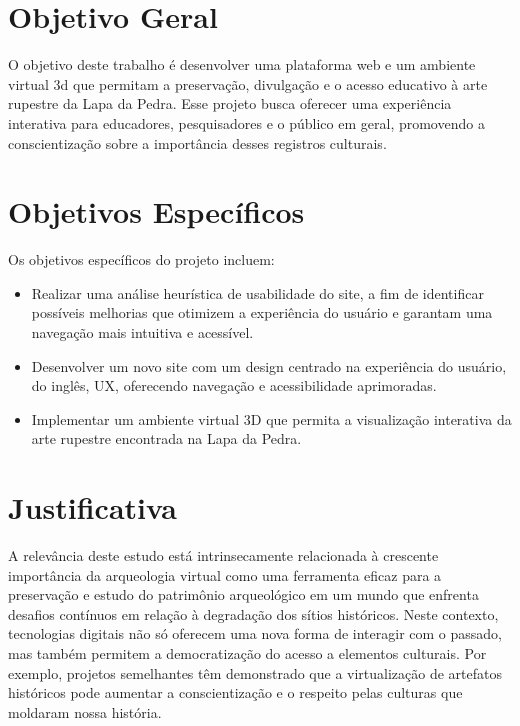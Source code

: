 \section{Objetivo Geral}
O objetivo deste trabalho é desenvolver uma plataforma web e um ambiente virtual \gls{3d} que permitam a preservação, divulgação e o acesso educativo à arte rupestre da Lapa da Pedra. Esse projeto busca oferecer uma experiência interativa para educadores, pesquisadores e o público em geral, promovendo a conscientização sobre a importância desses registros culturais.

\section{Objetivos Específicos}
Os objetivos específicos do projeto incluem:
\begin{itemize}
    \item Realizar uma análise heurística de usabilidade do site, a fim de identificar possíveis melhorias que otimizem a experiência do usuário e garantam uma navegação mais intuitiva e acessível.
    \item Desenvolver um novo site com um design centrado na experiência do usuário, do inglês, \gls{UX}, oferecendo navegação e acessibilidade aprimoradas.
    \item Implementar um ambiente virtual \gls{3D} que permita a visualização interativa da arte rupestre encontrada na Lapa da Pedra.
\end{itemize}


\section{Justificativa}
A relevância deste estudo está intrinsecamente relacionada à crescente importância da arqueologia virtual como uma ferramenta eficaz para a preservação e estudo do patrimônio arqueológico em um mundo que enfrenta desafios contínuos em relação à degradação dos sítios históricos. Neste contexto, tecnologias digitais não só oferecem uma nova forma de interagir com o passado, mas também permitem a democratização do acesso a elementos culturais. Por exemplo, projetos semelhantes têm demonstrado que a virtualização de artefatos históricos pode aumentar a conscientização e o respeito pelas culturas que moldaram nossa história.

